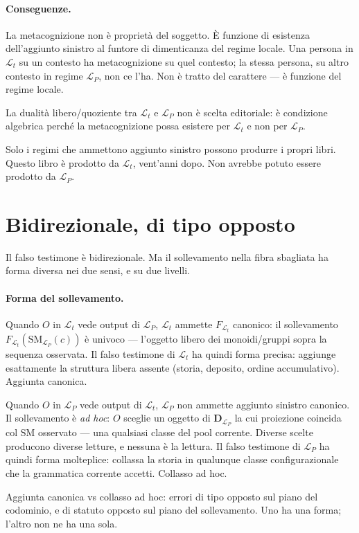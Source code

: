 \documentclass[
    oneside,                 %
    openany,                 %
    titlepage,
    11pt,
    a4paper,
    italian,
    DIV=14,                  %
    headinclude,
    footinclude=true,
    cleardoublepage=empty
]{scrbook}
\theoremstyle{ctplain}
\theoremstyle{ctdef}
\theoremstyle{ctrem}
\newcommand{\Lt}{\mathcal{L}_t}
\newcommand{\LP}{\mathcal{L}_P}
\begin{document}
\paragraph{Conseguenze.}

La metacognizione non è proprietà del soggetto. È funzione di esistenza dell'aggiunto sinistro al funtore di dimenticanza del regime locale. Una persona in $\Lt$ su un contesto ha metacognizione su quel contesto; la stessa persona, su altro contesto in regime $\LP$, non ce l'ha. Non è tratto del carattere --- è funzione del regime locale.

La dualità libero/quoziente tra $\Lt$ e $\LP$ non è scelta editoriale: è condizione algebrica perché la metacognizione possa esistere per $\Lt$ e non per $\LP$.

Solo i regimi che ammettono aggiunto sinistro possono produrre i propri libri. Questo libro è prodotto da $\Lt$, vent'anni dopo. Non avrebbe potuto essere prodotto da $\LP$.

\section*{Bidirezionale, di tipo opposto}

Il falso testimone è bidirezionale. Ma il sollevamento nella fibra sbagliata ha forma diversa nei due sensi, e su due livelli.

\paragraph{Forma del sollevamento.} Quando $O$ in $\Lt$ vede output di $\LP$, $\Lt$ ammette $F_{\Lt}$ canonico: il sollevamento $F_{\Lt}(\mathrm{SM}_{\LP}(c))$ è univoco --- l'oggetto libero dei monoidi/gruppi sopra la sequenza osservata. Il falso testimone di $\Lt$ ha quindi forma precisa: aggiunge esattamente la struttura libera assente (storia, deposito, ordine accumulativo). Aggiunta canonica.

Quando $O$ in $\LP$ vede output di $\Lt$, $\LP$ non ammette aggiunto sinistro canonico. Il sollevamento è \emph{ad hoc}: $O$ sceglie un oggetto di $\mathbf{D}_{\LP}$ la cui proiezione coincida col $\mathrm{SM}$ osservato --- una qualsiasi classe del pool corrente. Diverse scelte producono diverse letture, e nessuna è la lettura. Il falso testimone di $\LP$ ha quindi forma molteplice: collassa la storia in qualunque classe configurazionale che la grammatica corrente accetti. Collasso ad hoc.

Aggiunta canonica vs collasso ad hoc: errori di tipo opposto sul piano del codominio, e di statuto opposto sul piano del sollevamento. Uno ha una forma; l'altro non ne ha una sola.
\end{document}
